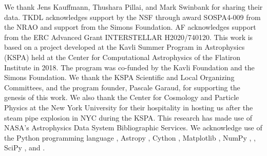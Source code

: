 \IfFileExists{emulateapjlegacy.cls}{\documentclass[iop]{emulateapjlegacy}}{\documentclass[iop]{emulateapj}}
\begin{document}
\acknowledgements

We thank Jens Kauffmann, Thushara Pillai, and Mark Swinbank for sharing their data.
%
TKDL acknowledges support by the NSF through award SOSPA4-009 from the NRAO and support from the Simons Foundation.
%
AF acknowledges support from the ERC Advanced Grant INTERSTELLAR H2020/740120.
%
This work is based on a project developed at the Kavli Summer Program in Astrophysics (KSPA) held at the Center for Computational Astrophysics of the Flatiron Institute in 2018. The program was co-funded by the Kavli Foundation and the Simons Foundation.
%
We thank the KSPA Scientific and Local Organizing Committees, and the program founder, Pascale Garaud, for supporting the genesis of this work.
%
We also thank the Center for Cosmology and Particle Physics at the New York University for their hospitality in hosting us after the steam pipe explosion in NYC during the KSPA.
%
This research has made use of NASA's Astrophysics Data System Bibliographic Services.
%
We acknowledge use of the Python programming language \citep{VanRossum1991}, Astropy \citep{astropy}, Cython \citep{behnel2010cython}, Matplotlib \citep{Hunter2007}, NumPy \citep{VanDerWalt2011},  \citep{Labadens2012}, SciPy \citep{scipyref}, and  \citep{Smith09a,Turk2011a}.
%



\end{document}
